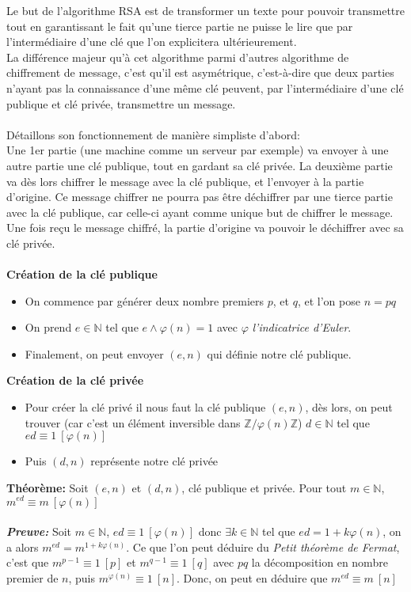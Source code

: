 \documentclass[12 pt]{article}
\begin{document}
\indent Le but de l'algorithme RSA est de transformer un texte pour pouvoir transmettre tout en garantissant le fait qu'une tierce partie ne puisse le lire que par l'intermédiaire d'une clé que l'on explicitera ultérieurement.
\\
\indent La différence majeur qu'à cet algorithme parmi d'autres algorithme de chiffrement de message, c'est qu'il est asymétrique, c'est-à-dire que deux parties n'ayant pas la connaissance d'une même clé peuvent, par l'intermédiaire d'une clé publique et clé privée, transmettre un message.
\\\\
Détaillons son fonctionnement de manière simpliste d'abord:
\\
\indent Une 1er partie (une machine comme un serveur par exemple) va envoyer à une autre partie une clé publique, tout en gardant sa clé privée. La deuxième partie va dès lors chiffrer le message avec la clé publique, et l'envoyer à la partie d'origine. Ce message chiffrer ne pourra pas être déchiffrer par une tierce partie avec la clé publique, car celle-ci ayant comme unique but de chiffrer le message. Une fois reçu le message chiffré, la partie d'origine va pouvoir le déchiffrer avec sa clé privée.
\\
\\
\textbf{Création de la clé publique}
\begin{itemize}
	\item On commence par générer deux nombre premiers $p$, et $q$, et l'on pose $n = pq$
	\item On prend $e \in \mathbb{N}$ tel que $e \wedge \varphi(n) = 1$ avec $\varphi$ \textit{l'indicatrice d'Euler}.
	\item Finalement, on peut envoyer $(e, n)$ qui définie notre clé publique.
\end{itemize}
\textbf{Création de la clé privée}
\begin{itemize}
	\item Pour créer la clé privé il nous faut la clé publique $(e, n)$, dès lors, on peut trouver (car c'est un élément inversible dans $\mathbb{Z} / \varphi (n) \mathbb{Z}$) $d \in \mathbb{N}$ tel que $ ed \equiv 1 ~ [\varphi (n)]$
	\item Puis $(d, n)$ représente notre clé privée
\end{itemize}
\textbf{Théorème:} Soit $(e, n)$ et $(d, n)$, clé publique et privée. Pour tout $m \in \mathbb{N}$, $m^{ed} \equiv m ~ [\varphi (n)]$ \\\\
\textit{\textbf{Preuve:}} Soit $m \in \mathbb{N}$, $ed \equiv 1 ~ [\varphi(n)]$ donc $\exists k \in \mathbb{N}$ tel que $ed = 1 + k\varphi(n)$, on a alors $m^{ed} = m^{1 + k\varphi(n)}$. Ce que l'on peut déduire du \textit{Petit théorème de Fermat}, c'est que $m^{p-1} \equiv 1 ~ [p]$ et $m^{q-1} \equiv 1 ~ [q]$ avec $pq$ la décomposition en nombre premier de $n$, puis $m^{\varphi(n)} \equiv 1 ~ [n]$. Donc, on peut en déduire que $m^{ed} \equiv m ~ [n]$
\end{document}
